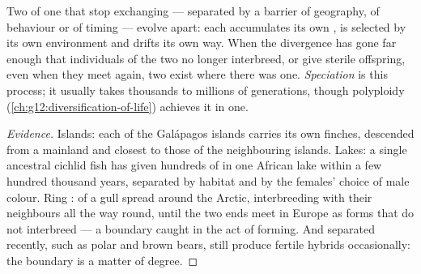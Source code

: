 \begin{proposition}[Speciation]\label{prop:g12:selection-drift-speciation:speciation}
Two  of one  that stop exchanging  --- separated
by a barrier of geography, of behaviour or of timing --- evolve apart:
each accumulates its own , is selected by its own environment
and drifts its own way. When the divergence has gone far enough that
individuals of the two  no longer interbreed, or give sterile
offspring, even when they meet again, two  exist where there was
one. \emph{Speciation} is this process; it usually
takes thousands to millions of generations, though polyploidy
(\cref{ch:g12:diversification-of-life}) achieves it in one.
\end{proposition}
\begin{proof}[Evidence]
Islands: each of the Galápagos islands carries its own finches,
descended from a mainland  and closest to those of the
neighbouring islands. Lakes: a single ancestral cichlid fish has given
hundreds of  in one African lake within a few hundred thousand
years, separated by habitat and by the females' choice of male colour.
Ring :  of a gull spread around the Arctic,
interbreeding with their neighbours all the way round, until the two
ends meet in Europe as forms that do not interbreed --- a 
boundary caught in the act of forming. And  separated recently,
such as polar and brown bears, still produce fertile hybrids
occasionally: the boundary is a matter of degree.
\end{proof}

